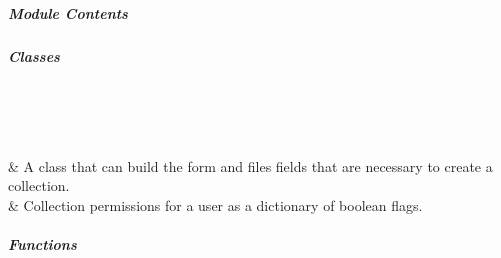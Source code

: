 \documentclass[letterpaper,10pt,english]{sphinxmanual}
\begin{document}
\subparagraph{Module Contents}
\label{\detokenize{autoapi/pine/client/models/index:module-contents}}

\subparagraph{Classes}
\label{\detokenize{autoapi/pine/client/models/index:classes}}

\begin{savenotes}\sphinxatlongtablestart\begin{longtable}[c]{}
\hline

\endfirsthead

%
{}\\
\hline

\endhead

\hline
{}\\
\endfoot

\endlastfoot

\sphinxAtStartPar
{\hyperref[\detokenize{autoapi/pine/client/models/index:pine.client.models.CollectionBuilder}]{}}
&
\sphinxAtStartPar
A class that can build the form and files fields that are necessary to create a collection.
\\
\hline
\sphinxAtStartPar
{\hyperref[\detokenize{autoapi/pine/client/models/index:pine.client.models.CollectionUserPermissions}]{}}
&
\sphinxAtStartPar
Collection permissions for a user as a dictionary of boolean flags.
\\
\hline
\end{longtable}\sphinxatlongtableend\end{savenotes}


\subparagraph{Functions}
\label{\detokenize{autoapi/pine/client/models/index:functions}}
\end{document}
